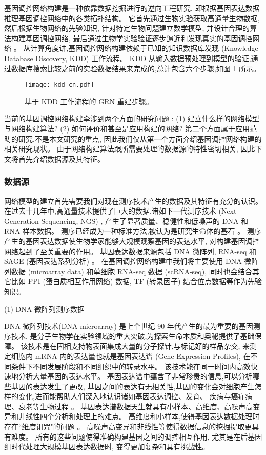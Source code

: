 基因调控网络构建是一种依靠数据挖掘进行的逆向工程研究, 即根据基因表达数据推理基因调控网络中的各类拓扑结构。
它首先通过生物实验获取高通量生物数据, 然后根据生物网络的先验知识, 针对特定生物问题建立数学模型, 
并设计合理的算法构建基因调控网络, 最后通过生物学实验验证逐步逼近和发现真实的基因调控网络 。
从计算角度讲,基因调控网络构建依赖于已知的知识数据库发现 (Knowledge Database Discovery, KDD) 工作流程。
KDD 从输入数据预处理到模型的验证,通过数据库搜索比较之前的实验数据结果来完成的,总计包含六个步骤,如图 \ref{cover-3} 所示。
\begin{figure}[!htbp]
    \centering
    \texttt{[image: kdd-cn.pdf]}
    \caption{基于 KDD 工作流程的 GRN 重建步骤。}
    \label{cover-3}
\end{figure}

当前的基因调控网络构建牵涉到两个方面的研究问题 :
(1) 建立什么样的网络模型与网络构建算法?
(2) 如何评价和甚至是应用构建的网络?
第二个方面属于应用范畴的研究,不是本文研究的重点, 因此我们仅从第一个方面介绍基因调控网络构建的相关研究现状。
由于网络构建算法跟所需要处理的数据源的特性密切相关, 因此下文将首先介绍数据源及其特征。

\subsubsection{数据源}

网络模型的建立首先需要我们对现在测序技术产生的数据及其特征有充分的认识。
在过去十几年中,高通量技术提供了巨大的数据,诸如下一代测序技术 (Next Generation Sequencing, NGS) , 
产生了显著质量、稳健性和低噪声的 DNA 和 RNA 样本数据。
测序已经成为一种标准方法,被认为是研究生命体的基石 。
测序产生的基因表达数据使生物学家能够大规模观察基因的表达水平, 对构建基因调控网络起到了至关重要的作用。
基因表达数据来源包括 DNA 微阵列, RNA-seq 和 SAGE (基因表达系列分析) 。
在基因调控网络构建中我们将主要使用 DNA 微阵列数据 (microarray data) 和单细胞 RNA-seq 数据 (scRNA-seq),
同时也会结合其它比如 PPI (蛋白质相互作用网络) 数据, TF (转录因子) 结合位点数据等作为先验知识。

(1) DNA 微阵列测序数据

DNA 微阵列技术(DNA microarray) 是上个世纪 90 年代产生的最为重要的基因测序技术,
是分子生物学在实验领域的重大突破,为探索生命本质和奥秘提供了基础保障。
该技术是在固相支持物表面集成大量的分子探针,与标记好的样品杂交,
来测定细胞内 mRNA 内的表达量也就是基因表达谱 (Gene Expression Profiles),
在不同条件下不同发展阶段和不同组织中的转录水平。
该技术能在同一时间内高效快速地分析大量基因的表达水平。
基因表达谱中蕴含了非常珍贵的信息,可以分析哪些基因的表达发生了更改, 
基因之间的表达有无相关性,基因的变化会对细胞产生怎样的变化,进而能帮助人们深入地认识诸如基因表达调控、发育、
疾病与癌症病理、衰老等生物过程 。
基因表达谱数据天生就具有小样本、高维度、高噪声高变异和非线性四个分析和处理上的难点。
高维度和小样本,使得基因表达数据处理时存在``维度诅咒"的问题 。
高噪声高变异和非线性等使得数据信息的挖掘提取更具有难度。
所有的这些问题使得准确构建基因之间的调控相互作用,
尤其是在后基因组时代处理大规模基因表达数据时,
变得更加复杂和具有挑战性。

